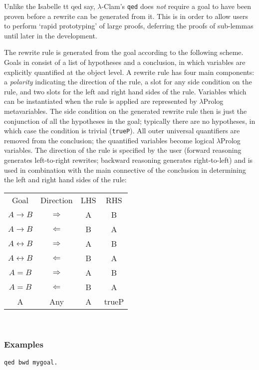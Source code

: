 Unlike the Isabelle {tt qed} say, $\lambda$-Clam's {\tt qed} does
\emph{not} require a goal to have been proven before a rewrite can be
generated from it.  This is in order to allow users to perform `rapid
prototyping' of large proofs, deferring the proofs of sub-lemmas until
later in the development.

The rewrite rule is generated from the goal according to the following
scheme.  Goals in \lclam consist of a list of hypotheses and a
conclusion, in which variables are explicitly quantified at the object
level.  A rewrite rule has four main components: a \emph{polarity}
indicating the direction of the rule, a slot for any side condition on
the rule, and two slots for the left and right hand sides of the rule.
Variables which can be instantiated when the rule is applied are
represented by $\lambda$Prolog metavariables.  The side condition on
the generated rewrite rule then is just the conjunction of all the
hypotheses in the goal; typically there are no hypotheses, in which
case the condition is trivial ({\tt trueP}).  All outer universal
quantifiers are removed from the conclusion; the quantified variables
become logical $\lambda$Prolog variables.  The direction of the rule
is specified by the user (forward reasoning generates left-to-right
rewrites; backward reasoning generates right-to-left) and is used in
combination with the main connective of the conclusion
in determining the left and right hand sides of the rule: \\

\begin{tabular}{cccc}
Goal & Direction & LHS & RHS \\
$A \rightarrow B$ & $\Rightarrow$ & A & B \\
$A \rightarrow B$ & $\Leftarrow$ & B & A \\
$A \leftrightarrow B$ & $\Rightarrow$ & A & B \\
$A \leftrightarrow B$ & $\Leftarrow$ & B & A \\
$A = B$ & $\Rightarrow$ & A & B \\
$A = B$ & $\Leftarrow$ & B & A \\
A & Any & A & trueP \\
\end{tabular} \\

\subsubsection*{Examples}
{\tt qed bwd mygoal.} 

